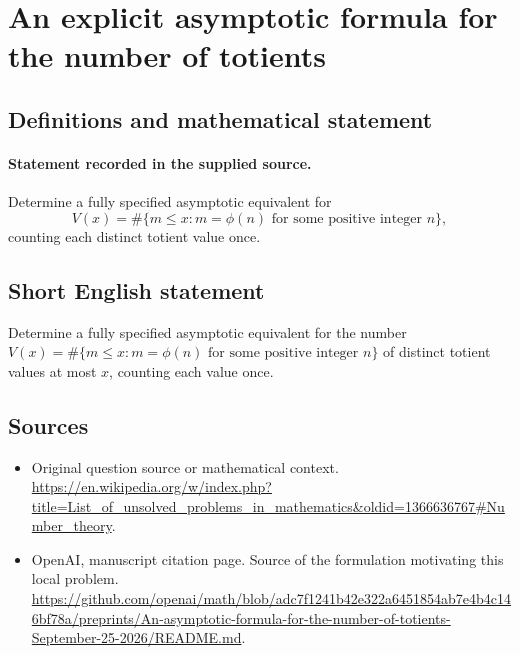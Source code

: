 \documentclass[11pt]{article}
\begin{document}
\section*{An explicit asymptotic formula for the number of totients}\label{30007260}
\subsection{Definitions and mathematical statement}
\paragraph{Statement recorded in the supplied source.}
Determine a fully specified asymptotic equivalent for
\[
V(x)=\#\{m\leq x:m=\phi(n)\text{ for some positive integer }n\},
\]
counting each distinct totient value once.
\subsection{Short English statement}
Determine a fully specified asymptotic equivalent for the number $V(x)=\#\{m\leq x:m=\phi(n)\text{ for some positive integer }n\}$ of distinct totient values at most $x$, counting each value once.
\subsection{Sources}
\begin{itemize}
\item[S1] Original question source or mathematical context.
\url{https://en.wikipedia.org/w/index.php?title=List_of_unsolved_problems_in_mathematics&oldid=1366636767#Number_theory}.
\item[S2] OpenAI, manuscript citation page. Source of the formulation motivating this local problem.
\url{https://github.com/openai/math/blob/adc7f1241b42e322a6451854ab7e4b4c146bf78a/preprints/An-asymptotic-formula-for-the-number-of-totients-September-25-2026/README.md}.
\end{itemize}
\end{document}
